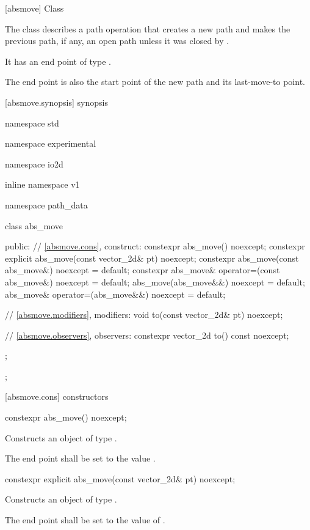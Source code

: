  [absmove] {Class }

\pnum
{}
The class  describes a path operation that creates a new path and makes the previous path, if any, an open path unless it was closed by .

\pnum
It has an end point of type .

\pnum
The end point is also the start point of the new path and its last-move-to point.

 [absmove.synopsis] { synopsis}

\begin{codeblock}
namespace std { namespace experimental { namespace io2d { inline namespace v1 {
  namespace path_data {
    class abs_move {
    public:
      // \ref{absmove.cons}, construct:
      constexpr abs_move() noexcept;
      constexpr explicit abs_move(const vector_2d& pt) noexcept;
      constexpr abs_move(const abs_move&) noexcept = default;
      constexpr abs_move& operator=(const abs_move&) noexcept =  default;
      abs_move(abs_move&&) noexcept = default;
      abs_move& operator=(abs_move&&) noexcept = default;

      // \ref{absmove.modifiers}, modifiers:
      void to(const vector_2d& pt) noexcept;

      // \ref{absmove.observers}, observers:
      constexpr vector_2d to() const noexcept;
    };
  };
} } } }
\end{codeblock}

 [absmove.cons] { constructors}

\begin{itemdecl}
constexpr abs_move() noexcept;
\end{itemdecl}
\begin{itemdescr}
\pnum
\effects
Constructs an object of type .

\pnum
The end point shall be set to the value .
\end{itemdescr}

\begin{itemdecl}
constexpr explicit abs_move(const vector_2d& pt) noexcept;
\end{itemdecl}
\begin{itemdescr}
\pnum
\effects
Constructs an object of type .

\pnum
The end point shall be set to the value of .
\end{itemdescr}

